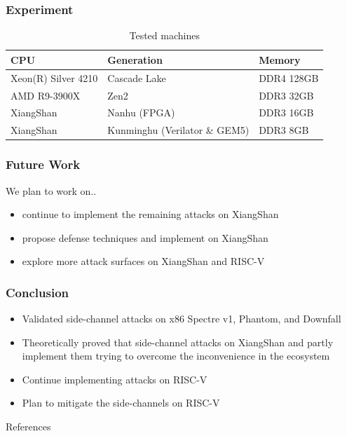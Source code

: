 \documentclass{beamer}
\begin{document}
\begin{frame}
    \frametitle{Experiment}
    \begin{table}[!htbp]
	\centering
	\begin{tabular}[c]{lll}
		\toprule
        CPU & Generation & Memory \\
		\midrule
        Xeon(R) Silver 4210 & Cascade Lake & DDR4 128GB \\
        AMD R9-3900X  & Zen2 & DDR3 32GB\\
        XiangShan & Nanhu (FPGA) & DDR3 16GB \\
        XiangShan & Kunminghu (Verilator \& GEM5) & DDR3 8GB \\
		\bottomrule 
	\end{tabular}
    \caption{Tested machines}
\end{table}

\end{frame}

\begin{frame}
    \frametitle{Future Work}
    We plan to work on..
    \begin{itemize}
        \item continue to implement the remaining attacks on XiangShan
        \item propose defense techniques and implement on XiangShan
        \item explore more attack surfaces on XiangShan and RISC-V
    \end{itemize}
\end{frame}

\begin{frame}
    \frametitle{Conclusion}
    \begin{itemize}
        \item Validated side-channel attacks on x86\newline
        Spectre v1, Phantom, and Downfall
        \item Theoretically proved that side-channel attacks on XiangShan and partly implement them\newline
        trying to overcome the inconvenience in the ecosystem
        \item Continue implementing attacks on RISC-V
        \item Plan to mitigate the side-channels on RISC-V
    \end{itemize}
\end{frame}

\begin{frame}[allowframebreaks]{References}
\tiny
\printbibliography
\end{frame}
\end{document}
